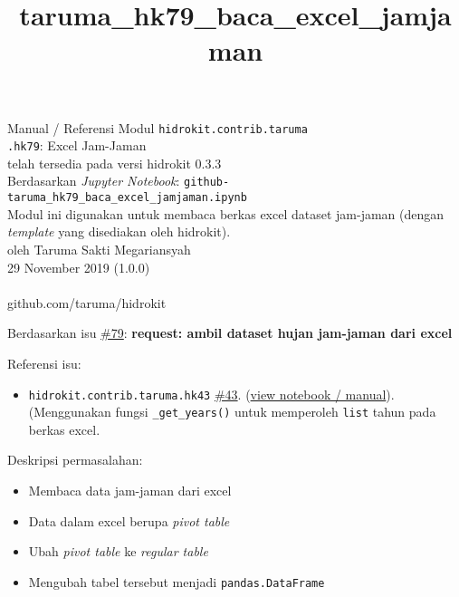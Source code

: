 \documentclass[11pt]{article}
\title{taruma\_hk79\_baca\_excel\_jamjaman}
\providecommand{\tightlist}{%
      \setlength{\itemsep}{0pt}\setlength{\parskip}{0pt}}
\begin{document}
  
	\begin{titlepage}
		\vspace*{\fill}
		\begin{center}
 		\normalsize Manual / Referensi Modul \texttt{hidrokit.contrib.taruma}\\
		\huge \texttt{.hk79}: Excel Jam-Jaman\\ 
		\small telah tersedia pada versi hidrokit 0.3.3 \\[0.2cm]
      	\small Berdasarkan \emph{Jupyter Notebook}: \texttt{github-taruma\_hk79\_baca\_excel\_jamjaman.ipynb} \\[0.5cm]
      	\small Modul ini digunakan untuk membaca berkas excel dataset jam-jaman (dengan \emph{template} yang disediakan oleh hidrokit). \\[0.5cm]
		\normalsize oleh Taruma Sakti Megariansyah\\[0.5cm]
      	\normalsize 29 November 2019 (1.0.0)\\[1cm]
    	\\
      	\normalsize github.com/taruma/hidrokit
		\end{center}
    	\vspace*{\fill}
	\end{titlepage}
    
    

    
    

    Berdasarkan isu
\href{https://github.com/taruma/hidrokit/issues/79}{\#79}:
\textbf{request: ambil dataset hujan jam-jaman dari excel}

Referensi isu:

\begin{itemize}
\tightlist
\item
  \texttt{hidrokit.contrib.taruma.hk43}
  \href{https://github.com/taruma/hidrokit/issues/43}{\#43}.
  (\href{https://nbviewer.jupyter.org/gist/taruma/a9dd4ea61db2526853b99600909e9c50}{view
  notebook / manual}). (Menggunakan fungsi \texttt{\_get\_years()} untuk
  memperoleh \texttt{list} tahun pada berkas excel.
\end{itemize}

Deskripsi permasalahan:

\begin{itemize}
\tightlist
\item
  Membaca data jam-jaman dari excel
\item
  Data dalam excel berupa \emph{pivot table}
\item
  Ubah \emph{pivot table} ke \emph{regular table}
\item
  Mengubah tabel tersebut menjadi \texttt{pandas.DataFrame}
\end{itemize}
\end{document}
